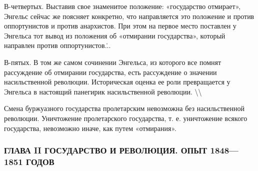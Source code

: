 \documentclass[12pt]{article}
\newcommand\ellipsis{%
  \textbackslash\thinspace\textellipsis\textbackslash
}
\newcommand{\parnum}{(\arabic{parcount})}
\newcounter{parcount}
\newenvironment{parnumbers}{%
  \par%
  \everypar{\noindent \stepcounter{parcount}\marginpar[]{\parnum}}%
}{}
\begin{document}
\begin{parnumbers}
В-четвертых. Выставив свое знаменитое положение: «государство отмирает», Энгельс сейчас же поясняет конкретно, что направляется это положение и против оппортунистов и против анархистов. При этом на первое место поставлен у Энгельса тот вывод из положения об «отмирании государства», который направлен против оппортунистов.\...\

В-пятых. В том же самом сочинении Энгельса, из которого все помнят рассуждение об отмирании государства, есть рассуждение о значении насильственной революции. Историческая оценка ее роли превращается у Энгельса в настоящий панегирик насильственной революции. \ellipsis

Смена буржуазного государства пролетарским невозможна без насильственной революции. Уничтожение пролетарского государства, т. е. уничтожение всякого государства, невозможно иначе, как путем «отмирания».
\end{parnumbers}

\subsubsection*{ГЛАВА II ГОСУДАРСТВО И РЕВОЛЮЦИЯ. ОПЫТ 1848—1851 ГОДОВ}
\end{document}
